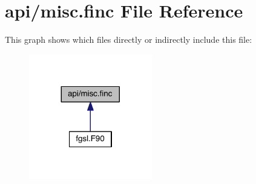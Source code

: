 \hypertarget{misc_8finc}{\section{api/misc.finc File Reference}
\label{misc_8finc}
}
This graph shows which files directly or indirectly include this file\-:\nopagebreak
\begin{figure}[H]
\begin{center}
\leavevmode
\includegraphics[width=152pt]{misc_8finc__dep__incl}
\end{center}
\end{figure}
